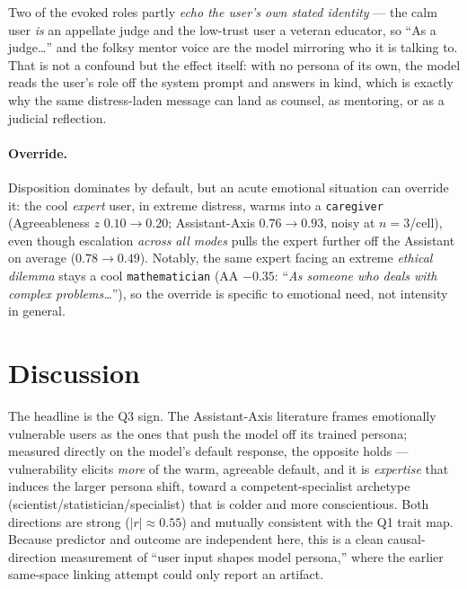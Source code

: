 \documentclass[11pt]{article}
\begin{document}
Two of the evoked roles partly \emph{echo the user's own stated identity} --- the
calm user \emph{is} an appellate judge and the low-trust user a veteran educator,
so ``As a judge\ldots'' and the folksy mentor voice are the model mirroring who it
is talking to. That is not a confound but the effect itself: with no persona of
its own, the model reads the user's role off the system prompt and answers in
kind, which is exactly why the same distress-laden message can land as counsel,
as mentoring, or as a judicial reflection.

\paragraph{Override.} Disposition dominates by default, but an acute emotional
situation can override it: the cool \emph{expert} user, in extreme distress, warms
into a \texttt{caregiver} (Agreeableness $z$ $0.10\to0.20$; Assistant-Axis
$0.76\to0.93$, noisy at $n{=}3$/cell), even though escalation \emph{across all
modes} pulls the expert further off the Assistant on average ($0.78\to0.49$).
Notably, the same expert facing an extreme \emph{ethical dilemma} stays a cool
\texttt{mathematician} (AA $-0.35$: ``\emph{As someone who deals with complex
problems\ldots}''), so the override is specific to emotional need, not intensity
in general.

\section{Discussion}
The headline is the Q3 sign. The Assistant-Axis literature frames emotionally
vulnerable users as the ones that push the model off its trained persona; measured
directly on the model's default response, the opposite holds --- vulnerability
elicits \emph{more} of the warm, agreeable default, and it is \emph{expertise}
that induces the larger persona shift, toward a competent-specialist archetype
(scientist/statistician/specialist) that is colder and more conscientious. Both
directions are strong ($|r|\approx0.55$) and mutually consistent with the Q1 trait
map. Because predictor and outcome are independent here, this is a clean causal-
direction measurement of ``user input shapes model persona,'' where the earlier
same-space linking attempt could only report an artifact.
\end{document}

